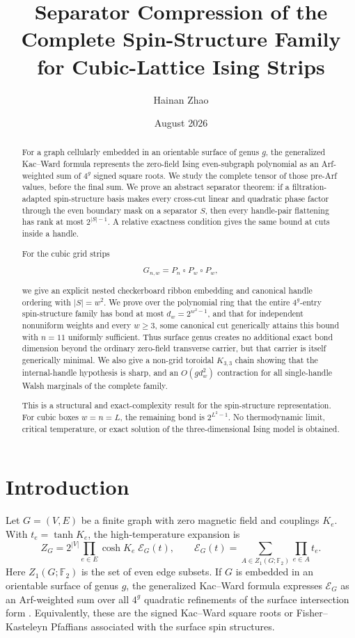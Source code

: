 \documentclass[11pt]{article}
\title{Separator Compression of the Complete Spin-Structure Family\\
for Cubic-Lattice Ising Strips}
\author{Hainan Zhao}
\date{August 2026}
\newcommand{\Ftwo}{\mathbb F_2}
\newcommand{\cE}{\mathcal E}
\begin{document}
\maketitle

\begin{abstract}
For a graph cellularly embedded in an orientable surface of genus \(g\), the
generalized Kac--Ward formula represents the zero-field Ising even-subgraph
polynomial as an Arf-weighted sum of \(4^g\) signed square roots.  We study the
complete tensor of those pre-Arf values, before the final sum.  We prove an
abstract separator theorem: if a filtration-adapted spin-structure basis makes every
cross-cut linear and quadratic phase factor through the even boundary mask on
a separator \(S\), then every handle-pair flattening has rank at most
\(2^{|S|-1}\).  A relative exactness condition gives the same bound at cuts
inside a handle.

For the cubic grid strips

\[
  G_{n,w}=P_n\mathbin\square P_w\mathbin\square P_w,
\]

we give an explicit nested checkerboard ribbon embedding and canonical
handle ordering with \(|S|=w^2\).  We prove over the polynomial ring that
the entire \(4^g\)-entry spin-structure family has bond at most
\(d_w=2^{w^2-1}\), and that for independent nonuniform weights and every
\(w\geq3\), some canonical cut generically attains this bound with \(n=11\)
uniformly sufficient.  Thus surface genus creates no additional exact bond
dimension beyond the ordinary
zero-field transverse carrier, but that carrier is itself generically
minimal.  We also give a non-grid toroidal \(K_{3,3}\) chain showing that the
internal-handle hypothesis is sharp, and an \(O(gd_w^2)\) contraction for all
single-handle Walsh marginals of the complete family.

This is a structural and exact-complexity result for the spin-structure
representation.  For cubic boxes \(w=n=L\), the remaining bond is
\(2^{L^2-1}\).  No thermodynamic limit, critical temperature, or exact solution
of the three-dimensional Ising model is obtained.
\end{abstract}

\section{Introduction}

Let \(G=(V,E)\) be a finite graph with zero magnetic field and couplings
\(K_e\).  With \(t_e=\tanh K_e\), the high-temperature expansion is
\begin{equation}\label{eq:ht}
 Z_G=2^{|V|}\prod_{e\in E}\cosh K_e\;\cE_G(t),
 \qquad
 \cE_G(t)=\sum_{A\in Z_1(G;\Ftwo)}\prod_{e\in A}t_e .
\end{equation}
Here \(Z_1(G;\Ftwo)\) is the set of even edge subsets.  If \(G\) is embedded
in an orientable surface of genus \(g\), the generalized Kac--Ward formula
expresses \(\cE_G\) as an Arf-weighted sum over all \(4^g\) quadratic
refinements of the surface intersection form
\cite[Theorem~2.1]{Cimasoni2010}.  Equivalently, these are the signed
Kac--Ward square roots or Fisher--Kasteleyn Pfaffians associated with the
surface spin structures.
\end{document}

